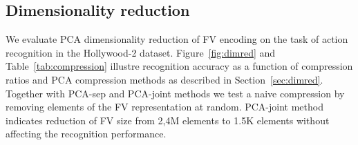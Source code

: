 \documentclass[10pt,twocolumn,letterpaper]{article}
\begin{document}









\subsection{Dimensionality reduction}
\label{sec:dimredexp}
We evaluate PCA dimensionality reduction of FV encoding on the task of action recognition in the Hollywood-2 dataset. Figure~\ref{fig:dimred} and Table~\ref{tab:compression} illustre recognition accuracy as a function of compression ratios and PCA compression methods as described in Section~\ref{sec:dimred}. Together with PCA-sep and PCA-joint methods we test a naive compression by removing elements of the FV representation at random. PCA-joint method indicates reduction of FV size from 2,4M elements to 1.5K elements without affecting the recognition performance.
\end{document}
